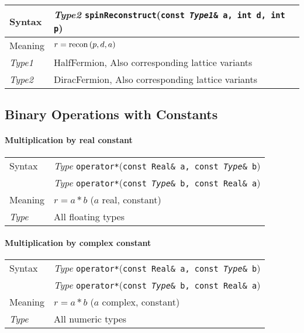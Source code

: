 \documentclass[12pt,letterpaper]{article}
\newcommand{\tReal}{Real}
\newcommand{\tHalfFermion}{HalfFermion}
\newcommand{\tDiracFermion}{DiracFermion}
\newcommand{\allNumericTypes}{All numeric types}
\newcommand{\allFloatTypes}{All floating types}
\newcommand{\simLatticeVariants}{Also corresponding lattice variants}
\newcommand{\itt}{\it Type}
\begin{document}
\begin{flushleft}
  \begin{tabular}{|l|l|}
  \hline
  Syntax      & {\it Type2} \verb|spinReconstruct|({\tt const {\it Type1}\& a, int d, int p})\\
  \hline
  Meaning     & $r = {\rm recon\,}(p,d,a)$\\
  \hline
  {\it Type1} & \tHalfFermion, \simLatticeVariants\\
  {\it Type2} & \tDiracFermion, \simLatticeVariants\\
  \hline
  \end{tabular}
\end{flushleft}


\subsection{Binary Operations with Constants}

\paragraph{Multiplication by real constant}

\begin{flushleft}
  \begin{tabular}{|l|l|}
  \hline
  Syntax      & {\it Type} \verb|operator*|({\tt const \tReal\& a, const {\it Type}\& b})\\
              & {\it Type} \verb|operator*|({\tt const {\it Type}\& b, const \tReal\& a})\\
  \hline
  Meaning     & $r = a*b$ ($a$ real, constant)\\
  \hline
  \itt     & \allFloatTypes \\
  \hline
  \end{tabular}
\end{flushleft}

\paragraph{Multiplication by complex constant}

\begin{flushleft}
  \begin{tabular}{|l|l|}
  \hline
  Syntax      & {\it Type} \verb|operator*|({\tt const \tReal\& a, const {\it Type}\& b})\\
              & {\it Type} \verb|operator*|({\tt const {\it Type}\& b, const \tReal\& a})\\
  \hline
  Meaning     & $r = a*b$ ($a$ complex, constant)\\
  \hline
  \itt     & \allNumericTypes \\
  \hline
  \end{tabular}
\end{flushleft}
\end{document}
